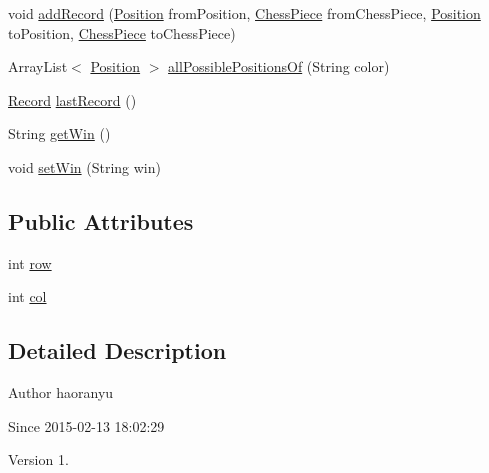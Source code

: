 \begin{DoxyCompactItemize}
\item 
void \hyperlink{classmodel_core_1_1_chess_board_af36430e89b73d56b322509621d8b27ee}{add\+Record} (\hyperlink{classmodel_core_1_1_position}{Position} from\+Position, \hyperlink{classmodel_chess_pieces_1_1_chess_piece}{Chess\+Piece} from\+Chess\+Piece, \hyperlink{classmodel_core_1_1_position}{Position} to\+Position, \hyperlink{classmodel_chess_pieces_1_1_chess_piece}{Chess\+Piece} to\+Chess\+Piece)
\item 
Array\+List$<$ \hyperlink{classmodel_core_1_1_position}{Position} $>$ \hyperlink{classmodel_core_1_1_chess_board_a9580196da2802e440d64b5d6f8d50bf1}{all\+Possible\+Positions\+Of} (String color)
\item 
\hyperlink{classmodel_core_1_1_record}{Record} \hyperlink{classmodel_core_1_1_chess_board_ae899ac8bc62aaf23e4724870932ac6bf}{last\+Record} ()
\item 
String \hyperlink{classmodel_core_1_1_chess_board_a34e37f076c55fdc46d66ac2dc0280267}{get\+Win} ()
\item 
void \hyperlink{classmodel_core_1_1_chess_board_a504f3ee56db184a7e2d8a0aa0b4da1a5}{set\+Win} (String win)
\end{DoxyCompactItemize}
\subsection*{Public Attributes}
\begin{DoxyCompactItemize}
\item 
int \hyperlink{classmodel_core_1_1_chess_board_a97b8b44a011e141557812f801be59fb3}{row}
\item 
int \hyperlink{classmodel_core_1_1_chess_board_ad7110bd9ee10396094cb5a58406bd04e}{col}
\end{DoxyCompactItemize}


\subsection{Detailed Description}
\begin{DoxyAuthor}{Author}
haoranyu 
\end{DoxyAuthor}
\begin{DoxySince}{Since}
2015-\/02-\/13 18\+:02\+:29 
\end{DoxySince}
\begin{DoxyVersion}{Version}
1. 
\end{DoxyVersion}


